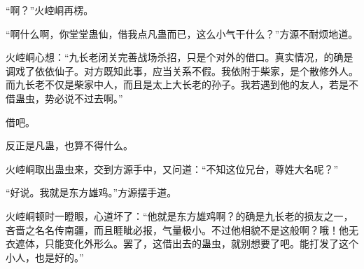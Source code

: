 \begin{this_body}
“啊？”火崆峒再楞。

“啊什么啊，你堂堂蛊仙，借我点凡蛊而已，这么小气干什么？”方源不耐烦地道。

火崆峒心想：“九长老闭关完善战场杀招，只是个对外的借口。真实情况，的确是调戏了依依仙子。对方既知此事，应当关系不假。我依附于柴家，是个散修外人。而九长老不仅是柴家中人，而且是太上大长老的孙子。我若遇到他的友人，若是不借蛊虫，势必说不过去啊。”

借吧。

反正是凡蛊，也算不得什么。

火崆峒取出蛊虫来，交到方源手中，又问道：“不知这位兄台，尊姓大名呢？”

“好说。我就是东方雄鸡。”方源摆手道。

火崆峒顿时一瞪眼，心道坏了：“他就是东方雄鸡啊？的确是九长老的损友之一，吝啬之名名传南疆，而且睚眦必报，气量极小。不过他相貌不是这般啊？哦！他无衣遮体，只能变化外形么。罢了，这借出去的蛊虫，就别想要了吧。能打发了这个小人，也是好的。”

\end{this_body}

